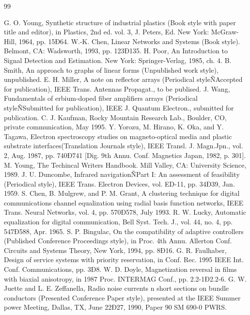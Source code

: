 \documentclass[letterpaper, 10 pt, conference]{ieeeconf}  %
\begin{document}
\begin{thebibliography}{99}

 G. O. Young, Synthetic structure of industrial plastics (Book style with paper title and editor), 	in Plastics, 2nd ed. vol. 3, J. Peters, Ed.  New York: McGraw-Hill, 1964, pp. 15Ð64.
 W.-K. Chen, Linear Networks and Systems (Book style).	Belmont, CA: Wadsworth, 1993, pp. 123Ð135.
 H. Poor, An Introduction to Signal Detection and Estimation.   New York: Springer-Verlag, 1985, ch. 4.
 B. Smith, An approach to graphs of linear forms (Unpublished work style), unpublished.
 E. H. Miller, A note on reflector arrays (Periodical styleÑAccepted for publication), IEEE Trans. Antennas Propagat., to be publised.
 J. Wang, Fundamentals of erbium-doped fiber amplifiers arrays (Periodical styleÑSubmitted for publication), IEEE J. Quantum Electron., submitted for publication.
 C. J. Kaufman, Rocky Mountain Research Lab., Boulder, CO, private communication, May 1995.
 Y. Yorozu, M. Hirano, K. Oka, and Y. Tagawa, Electron spectroscopy studies on magneto-optical media and plastic substrate interfaces(Translation Journals style), IEEE Transl. J. Magn.Jpn., vol. 2, Aug. 1987, pp. 740Ð741 [Dig. 9th Annu. Conf. Magnetics Japan, 1982, p. 301].
 M. Young, The Techincal Writers Handbook.  Mill Valley, CA: University Science, 1989.
 J. U. Duncombe, Infrared navigationÑPart I: An assessment of feasibility (Periodical style), IEEE Trans. Electron Devices, vol. ED-11, pp. 34Ð39, Jan. 1959.
 S. Chen, B. Mulgrew, and P. M. Grant, A clustering technique for digital communications channel equalization using radial basis function networks, IEEE Trans. Neural Networks, vol. 4, pp. 570Ð578, July 1993.
 R. W. Lucky, Automatic equalization for digital communication, Bell Syst. Tech. J., vol. 44, no. 4, pp. 547Ð588, Apr. 1965.
 S. P. Bingulac, On the compatibility of adaptive controllers (Published Conference Proceedings style), in Proc. 4th Annu. Allerton Conf. Circuits and Systems Theory, New York, 1994, pp. 8Ð16.
 G. R. Faulhaber, Design of service systems with priority reservation, in Conf. Rec. 1995 IEEE Int. Conf. Communications, pp. 3Ð8.
 W. D. Doyle, Magnetization reversal in films with biaxial anisotropy, in 1987 Proc. INTERMAG Conf., pp. 2.2-1Ð2.2-6.
 G. W. Juette and L. E. Zeffanella, Radio noise currents n short sections on bundle conductors (Presented Conference Paper style), presented at the IEEE Summer power Meeting, Dallas, TX, June 22Ð27, 1990, Paper 90 SM 690-0 PWRS.

\end{thebibliography}
\end{document}
